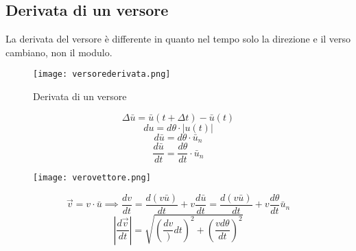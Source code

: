 \documentclass[../../main.tex]{subfiles}
\begin{document}
\newpage
\subsection{Derivata di un versore}
La derivata del versore è differente in quanto nel tempo solo la direzione e il verso cambiano, non il modulo.
\begin{figure}[h!]
    \centering
    \texttt{[image: versorederivata.png]}
    \caption{Derivata di un versore}
\end{figure}
\[
    \Delta \bar{u} = \bar{u}(t+\Delta t) - \bar{u}(t)
\]
\[
    du = d\theta \cdot |u(t)|
\]
\[
    d\bar{u} = d\theta \cdot \bar{u}_n
\]
\[
    \dfrac{d\bar{u}}{dt} = \dfrac{d\theta}{dt} \cdot \bar{u}_n
\]

\begin{figure}[h!]
    \centering
    \texttt{[image: verovettore.png]}
\end{figure}

\[
    \vec{v} = v \cdot \bar{u} \implies \dfrac{dv}{dt} = \dfrac{d(v\bar{u})}{dt} + v\dfrac{d\bar{u}}{dt} = \dfrac{d(v\bar{u})}{dt} + v\dfrac{d\theta}{dt}\bar{u}_n
\]
\[
    |\dfrac{d\vec{v}}{dt}| = \sqrt{(\dfrac{dv}){dt})^2 + (\dfrac{vd\theta}{dt})^2}
\]

\subsection{}
\end{document}
